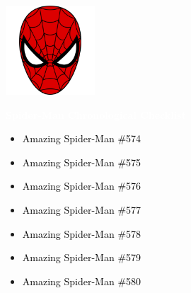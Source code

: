 \documentclass[12pt]{article}
\newcommand{\checkbox}{\raisebox{0.0ex}{\fbox{\rule{0ex}{1.5ex} \rule{1.5ex}{0ex}}}}
\begin{document}
\newpage
{}
\begin{center}
    \vspace*{2cm}
    \includegraphics[width=0.25\textwidth]{spiderman.png}
    \vspace{0.5cm}

    {\Huge \textbf{\textcolor{white}{Spider-Man Chronological Checklist}}}
\end{center}

\vspace{0.5cm}

\begin{center}
\begin{tcolorbox}[colback=white!95!gray, colframe=black, width=0.9\textwidth, arc=4mm, auto outer arc, boxrule=0.8pt]
\begin{itemize}[left=0pt,label={\checkbox}]
    \item \textcolor{black}{Amazing Spider-Man \#574}
    \item \textcolor{black}{Amazing Spider-Man \#575}
    \item \textcolor{black}{Amazing Spider-Man \#576}
    \item \textcolor{black}{Amazing Spider-Man \#577}
    \item \textcolor{black}{Amazing Spider-Man \#578}
    \item \textcolor{black}{Amazing Spider-Man \#579}
    \item \textcolor{black}{Amazing Spider-Man \#580}
\end{itemize}
\end{tcolorbox}
\end{center}
\end{document}
